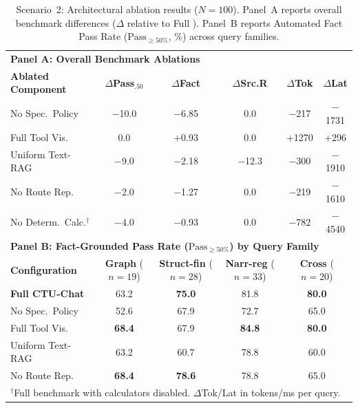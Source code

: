 \begin{table}[!htb]
\centering
\caption{Scenario~2: Architectural ablation results ($N=100$). Panel~A reports overall benchmark differences ($\Delta$ relative to Full \system{}). Panel~B reports Automated Fact Pass Rate ($\text{Pass}_{\ge 50\%}$, \%) across query families.}
\label{tab:ablation}
{\small\setlength{\tabcolsep}{3.5pt}
\begin{tabular}{lccccc}
\toprule
\multicolumn{6}{l}{\textbf{Panel A: Overall Benchmark Ablations}} \\
\textbf{Ablated Component} & \textbf{$\Delta$Pass$_{.50}$} & \textbf{$\Delta$Fact} & \textbf{$\Delta$Src.R} & \textbf{$\Delta$Tok} & \textbf{$\Delta$Lat} \\
\midrule
No Spec.~Policy  & $-$10.0 & $-$6.85 & 0.0  & $-$217  & $-$1731 \\
Full Tool Vis.   & 0.0     & +0.93   & 0.0  & +1270   & +296 \\
Uniform Text-RAG & $-$9.0  & $-$2.18 & $-$12.3 & $-$300  & $-$1910 \\
No Route Rep.    & $-$2.0  & $-$1.27 & 0.0  & $-$219  & $-$1610 \\
No Determ.~Calc.$^\dagger$ & $-$4.0 & $-$0.93 & 0.0 & $-$782 & $-$4540 \\
\midrule
\multicolumn{6}{l}{\textbf{Panel B: Fact-Grounded Pass Rate ($\text{Pass}_{\ge 50\%}$) by Query Family}} \\
\textbf{Configuration} & \textbf{Graph} ($n{=}19$) & \textbf{Struct-fin} ($n{=}28$) & \textbf{Narr-reg} ($n{=}33$) & \multicolumn{2}{c}{\textbf{Cross} ($n{=}20$)} \\
\midrule
\textbf{Full CTU-Chat} & 63.2 & \textbf{75.0} & 81.8 & \multicolumn{2}{c}{\textbf{80.0}} \\
No Spec.~Policy  & 52.6 & 67.9 & 72.7 & \multicolumn{2}{c}{65.0} \\
Full Tool Vis.   & \textbf{68.4} & 67.9 & \textbf{84.8} & \multicolumn{2}{c}{\textbf{80.0}} \\
Uniform Text-RAG & 63.2 & 60.7 & 78.8 & \multicolumn{2}{c}{60.0} \\
No Route Rep.    & \textbf{68.4} & \textbf{78.6} & 78.8 & \multicolumn{2}{c}{65.0} \\
\bottomrule
\multicolumn{6}{l}{\rule{0pt}{2.5ex}\footnotesize $^\dagger$Full benchmark with calculators disabled. $\Delta$Tok/Lat in tokens/ms per query.}
\end{tabular}}
\end{table}

